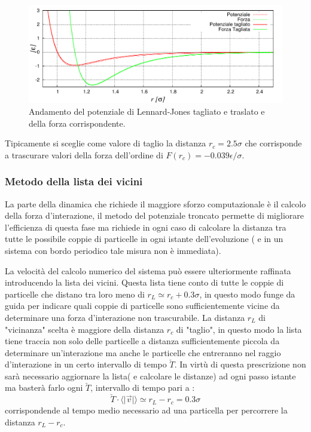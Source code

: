 \documentclass[11pt]{article}
\theoremstyle{plain}
\theoremstyle{remark}
\begin{document}
	\begin{figure}
		\centering
		\includegraphics[scale=0.5]{Immagini/Soffici/potenziale}
		\caption[Potenziale di L.-J. tagliato]{Andamento del potenziale di Lennard-Jones tagliato e traslato e della forza corrispondente.}\label{fig: LJCut}
	\end{figure}
Tipicamente si sceglie come valore di taglio la distanza $r_c = 2.5 \sigma$ che corrisponde a trascurare valori della forza dell'ordine di $F(r_c) = -0.039 \epsilon / \sigma$.

\subsubsection{Metodo della lista dei vicini}
La parte della dinamica che richiede il maggiore sforzo computazionale è il calcolo della forza d'interazione, il metodo del potenziale troncato permette di migliorare l'efficienza di questa fase ma richiede in ogni caso di calcolare la distanza tra tutte le possibile coppie di particelle in ogni istante dell'evoluzione ( e in un sistema con bordo periodico tale misura non è immediata).

La velocità del calcolo numerico del sistema può essere ulteriormente raffinata introducendo la lista dei vicini.
Questa lista tiene conto di tutte le coppie di particelle che distano tra loro meno di $r_L \simeq r_c +0.3\sigma$, in questo modo funge da guida per indicare quali coppie di particelle sono sufficientemente vicine da determinare una forza d'interazione non trascurabile.
La distanza $r_L$ di "vicinanza" scelta è maggiore della distanza $r_c$ di "taglio", in questo modo la lista tiene traccia non solo delle particelle a distanza sufficientemente piccola da determinare un'interazione ma anche le particelle che entreranno nel raggio d'interazione in un certo intervallo di tempo $\check{T}$. In virtù di questa prescrizione non sarà necessario aggiornare la lista( e calcolare le distanze) ad ogni passo istante ma basterà farlo ogni $\check{T}$, intervallo di tempo pari a :
\begin{displaymath}
\check{T} \cdot \langle \vert \vec{v} \vert \rangle \simeq r_L - r_c = 0.3 \sigma
\end{displaymath}
corrispondende al tempo medio necessario ad una particella per percorrere la distanza $r_L - r_c$.
\end{document}
